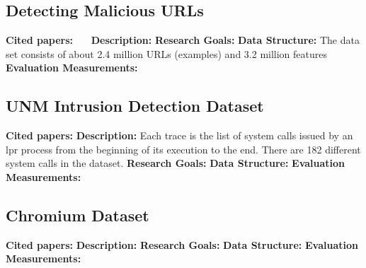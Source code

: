 \subsection{Detecting Malicious URLs}
\textbf{Cited papers:}~\cite{ma2010exploiting}~\cite{ma2009identifying}~\cite{ma2009beyond} \newline
\textbf{Description:} \newline
\textbf{Research Goals:}  \newline
\textbf{Data Structure:} The data set consists of about 2.4 million URLs (examples) and 3.2 million features \newline
\textbf{Evaluation Measurements:} \newline


\subsection{UNM Intrusion Detection Dataset}
\textbf{Cited papers:} \newline
\textbf{Description:} Each trace is the list of system calls issued by an lpr process from the beginning of its execution to the end. There are 182 different system calls in the dataset.\newline
\textbf{Research Goals:}  \newline
\textbf{Data Structure:} \newline
\textbf{Evaluation Measurements:} \newline


\subsection{Chromium Dataset}
\textbf{Cited papers:} \newline
\textbf{Description:} \newline
\textbf{Research Goals:}  \newline
\textbf{Data Structure:} \newline
\textbf{Evaluation Measurements:} \newline

